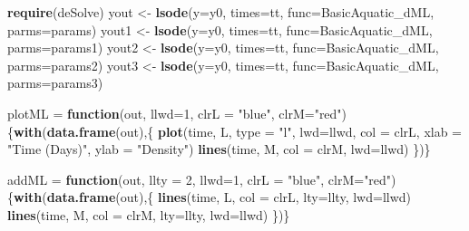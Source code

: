 \documentclass[
]{book}
\newenvironment{Shaded}{\begin{snugshade}}{\end{snugshade}}
\newcommand{\AttributeTok}[1]{\textcolor[rgb]{0.13,0.29,0.53}{#1}}
\newcommand{\ControlFlowTok}[1]{\textcolor[rgb]{0.13,0.29,0.53}{\textbf{#1}}}
\newcommand{\DecValTok}[1]{\textcolor[rgb]{0.00,0.00,0.81}{#1}}
\newcommand{\FunctionTok}[1]{\textcolor[rgb]{0.13,0.29,0.53}{\textbf{#1}}}
\newcommand{\NormalTok}[1]{#1}
\newcommand{\OtherTok}[1]{\textcolor[rgb]{0.56,0.35,0.01}{#1}}
\newcommand{\StringTok}[1]{\textcolor[rgb]{0.31,0.60,0.02}{#1}}
\begin{document}
\begin{Shaded}
\begin{Highlighting}[]
\FunctionTok{require}\NormalTok{(deSolve)}
\NormalTok{yout  }\OtherTok{\textless{}{-}} \FunctionTok{lsode}\NormalTok{(}\AttributeTok{y=}\NormalTok{y0, }\AttributeTok{times=}\NormalTok{tt, }\AttributeTok{func=}\NormalTok{BasicAquatic\_dML, }\AttributeTok{parms=}\NormalTok{params) }
\NormalTok{yout1 }\OtherTok{\textless{}{-}} \FunctionTok{lsode}\NormalTok{(}\AttributeTok{y=}\NormalTok{y0, }\AttributeTok{times=}\NormalTok{tt, }\AttributeTok{func=}\NormalTok{BasicAquatic\_dML, }\AttributeTok{parms=}\NormalTok{params1) }
\NormalTok{yout2 }\OtherTok{\textless{}{-}} \FunctionTok{lsode}\NormalTok{(}\AttributeTok{y=}\NormalTok{y0, }\AttributeTok{times=}\NormalTok{tt, }\AttributeTok{func=}\NormalTok{BasicAquatic\_dML, }\AttributeTok{parms=}\NormalTok{params2) }
\NormalTok{yout3 }\OtherTok{\textless{}{-}} \FunctionTok{lsode}\NormalTok{(}\AttributeTok{y=}\NormalTok{y0, }\AttributeTok{times=}\NormalTok{tt, }\AttributeTok{func=}\NormalTok{BasicAquatic\_dML, }\AttributeTok{parms=}\NormalTok{params3) }
\end{Highlighting}
\end{Shaded}

\begin{Shaded}
\begin{Highlighting}[]
\NormalTok{plotML }\OtherTok{=} \ControlFlowTok{function}\NormalTok{(out, }\AttributeTok{llwd=}\DecValTok{1}\NormalTok{, }\AttributeTok{clrL =} \StringTok{"blue"}\NormalTok{, }\AttributeTok{clrM=}\StringTok{"red"}\NormalTok{)\{}\FunctionTok{with}\NormalTok{(}\FunctionTok{data.frame}\NormalTok{(out),\{}
  \FunctionTok{plot}\NormalTok{(time, L, }\AttributeTok{type =} \StringTok{"l"}\NormalTok{, }\AttributeTok{lwd=}\NormalTok{llwd, }\AttributeTok{col =}\NormalTok{ clrL, }\AttributeTok{xlab =} \StringTok{"Time (Days)"}\NormalTok{, }\AttributeTok{ylab =} \StringTok{"Density"}\NormalTok{) }
  \FunctionTok{lines}\NormalTok{(time, M, }\AttributeTok{col =}\NormalTok{ clrM, }\AttributeTok{lwd=}\NormalTok{llwd) }
\NormalTok{\})\}}

\NormalTok{addML }\OtherTok{=} \ControlFlowTok{function}\NormalTok{(out, }\AttributeTok{llty =} \DecValTok{2}\NormalTok{, }\AttributeTok{llwd=}\DecValTok{1}\NormalTok{, }\AttributeTok{clrL =} \StringTok{"blue"}\NormalTok{, }\AttributeTok{clrM=}\StringTok{"red"}\NormalTok{)\{}\FunctionTok{with}\NormalTok{(}\FunctionTok{data.frame}\NormalTok{(out),\{}
  \FunctionTok{lines}\NormalTok{(time, L, }\AttributeTok{col =}\NormalTok{ clrL, }\AttributeTok{lty=}\NormalTok{llty, }\AttributeTok{lwd=}\NormalTok{llwd) }
  \FunctionTok{lines}\NormalTok{(time, M, }\AttributeTok{col =}\NormalTok{ clrM, }\AttributeTok{lty=}\NormalTok{llty, }\AttributeTok{lwd=}\NormalTok{llwd) }
\NormalTok{\})\}}
\end{Highlighting}
\end{Shaded}
\end{document}
